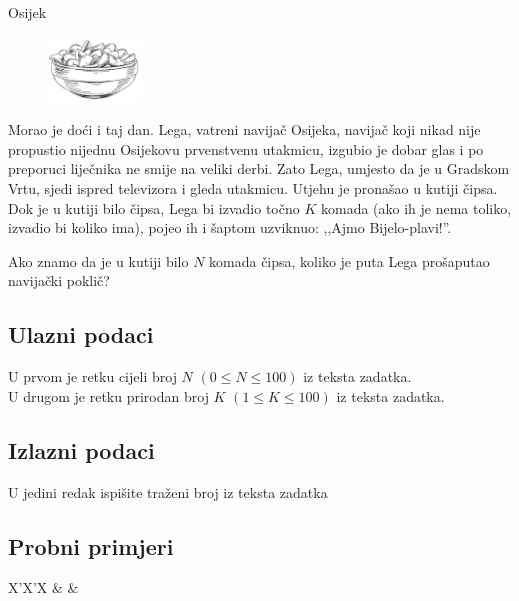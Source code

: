 \begin{statement}[
  problempoints=20,
  timelimit=1 sekunda,
  memorylimit=512 MiB,
]{Osijek}

\setlength\intextsep{-0.1cm}
\begin{figure}
\centering
\includegraphics[width=0.22\textwidth]{img/chips.png}
\end{figure}

Morao je doći i taj dan. Lega, vatreni navijač Osijeka, navijač koji nikad
nije propustio nijednu Osijekovu prvenstvenu utakmicu, izgubio je dobar glas
i po preporuci liječnika ne smije na veliki derbi. Zato Lega, umjesto da je u
Gradskom Vrtu, sjedi ispred televizora i gleda utakmicu. Utjehu je pronašao u
kutiji čipsa. Dok je u kutiji bilo čipsa, Lega bi izvadio točno $K$ komada (ako
ih je nema toliko, izvadio bi koliko ima), pojeo ih i šaptom uzviknuo: ,,Ajmo
Bijelo-plavi!''.

Ako znamo da je u kutiji bilo $N$ komada čipsa, koliko je puta
Lega prošaputao navijački poklič?

\subsection*{Ulazni podaci}
U prvom je retku cijeli broj $N$ $(0 \le N \le 100)$ iz teksta zadatka.\\
U drugom je retku prirodan broj $K$ $(1 \le K \le 100)$ iz teksta zadatka.

\subsection*{Izlazni podaci}
U jedini redak ispišite traženi broj iz teksta zadatka


\subsection*{Probni primjeri}
\begin{tabularx}{\textwidth}{X'X'X}
 &
 &
\end{tabularx}


\end{statement}
